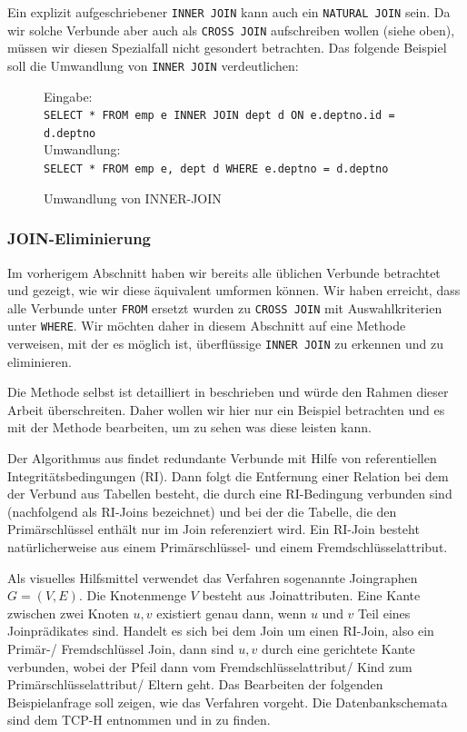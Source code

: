 Ein explizit aufgeschriebener \verb|INNER JOIN| kann auch ein \verb|NATURAL JOIN| sein. Da wir solche Verbunde aber auch als \verb|CROSS JOIN| aufschreiben wollen (siehe oben), müssen wir diesen Spezialfall nicht gesondert betrachten. Das folgende Beispiel soll die Umwandlung von \verb|INNER JOIN| verdeutlichen:

\begin{figure}[H]
Eingabe:\\
\verb|SELECT * FROM emp e INNER JOIN dept d ON e.deptno.id = d.deptno|\\

Umwandlung:\\
\verb|SELECT * FROM emp e, dept d WHERE e.deptno = d.deptno|\\
\caption{Umwandlung von INNER-JOIN}
\end{figure}


\subsubsection{JOIN-Eliminierung}

Im vorherigem Abschnitt haben wir bereits alle üblichen Verbunde betrachtet und gezeigt, wie wir diese äquivalent umformen können. Wir haben erreicht, dass alle Verbunde unter \verb|FROM| ersetzt wurden zu \verb|CROSS JOIN| mit Auswahlkriterien unter \verb|WHERE|. Wir möchten daher in diesem Abschnitt auf eine Methode verweisen, mit der es möglich ist, überflüssige \verb|INNER JOIN| zu erkennen und zu eliminieren.

Die Methode selbst ist detailliert in \cite{joinelem2} beschrieben und würde den Rahmen dieser Arbeit überschreiten. Daher wollen wir hier nur ein Beispiel betrachten und es mit der Methode bearbeiten, um zu sehen was diese leisten kann.

Der Algorithmus aus \cite{joinelem2} findet redundante Verbunde mit Hilfe von referentiellen Integritätsbedingungen (RI). Dann folgt die Entfernung einer Relation bei dem der Verbund aus Tabellen besteht, die durch eine RI-Bedingung verbunden sind (nachfolgend als RI-Joins bezeichnet) und bei der die Tabelle, die den Primärschlüssel enthält nur im Join referenziert wird. Ein RI-Join besteht natürlicherweise aus einem Primärschlüssel- und einem Fremdschlüsselattribut.

Als visuelles Hilfsmittel verwendet das Verfahren sogenannte Joingraphen $G=(V,E)$. Die Knotenmenge $V$ besteht aus Joinattributen. Eine Kante zwischen zwei Knoten $u,v$ existiert genau dann, wenn $u$ und $v$ Teil eines Joinprädikates sind. Handelt es sich bei dem Join um einen RI-Join, also ein Primär-/ Fremdschlüssel Join, dann sind $u,v$ durch eine gerichtete Kante verbunden, wobei der Pfeil dann vom Fremdschlüsselattribut/ Kind zum Primärschlüsselattribut/ Eltern geht. Das Bearbeiten der folgenden Beispielanfrage soll zeigen, wie das Verfahren vorgeht. Die Datenbankschemata sind dem TCP-H entnommen und in \cite{partsubdb} zu finden.

